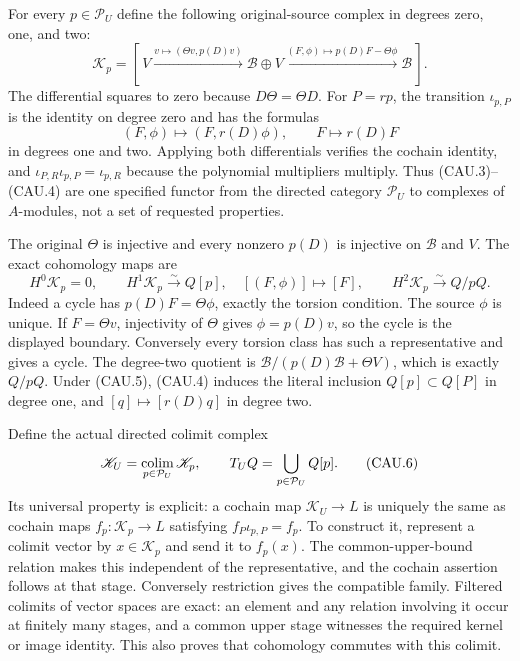 For every $p\in\mathcal P_U$ define the following original-source
complex in degrees zero, one, and two:
\[
 \mathscr K_p=
 [\,V\xrightarrow{v\mapsto(\Theta v,p(D)v)}
       \mathscr B\oplus V
     \xrightarrow{(F,\phi)\mapsto p(D)F-\Theta\phi}\mathscr B\,].
                                                               \tag{CAU.3}
\]
The differential squares to zero because $D\Theta=\Theta D$.
For $P=rp$, the transition $\iota_{p,P}$ is the identity on degree
zero and has the formulas
\[
 (F,\phi)\longmapsto(F,r(D)\phi),\qquad
 F\longmapsto r(D)F                                           \tag{CAU.4}
\]
in degrees one and two.  Applying both differentials verifies the
cochain identity, and $\iota_{P,R}\iota_{p,P}=\iota_{p,R}$ because
the polynomial multipliers multiply.  Thus (CAU.3)--(CAU.4) are one
specified functor from the directed category $\mathcal P_U$ to complexes
of $A$-modules, not a set of requested properties.

The original $\Theta$ is injective and every nonzero $p(D)$ is injective
on $\mathscr B$ and $V$.  The exact cohomology maps are
\[
 H^0\mathscr K_p=0,\qquad
 H^1\mathscr K_p\xrightarrow{\sim}Q[p],\quad[(F,\phi)]\mapsto[F],
 \qquad H^2\mathscr K_p\xrightarrow{\sim}Q/pQ.                 \tag{CAU.5}
\]
Indeed a cycle has $p(D)F=\Theta\phi$, exactly the torsion condition.
The source $\phi$ is unique.  If $F=\Theta v$, injectivity of $\Theta$
gives $\phi=p(D)v$, so the cycle is the displayed boundary.  Conversely
every torsion class has such a representative and gives a cycle.
The degree-two quotient is
$\mathscr B/(p(D)\mathscr B+\Theta V)$, which is exactly $Q/pQ$.
Under (CAU.5), (CAU.4) induces the literal inclusion $Q[p]\subset Q[P]$
in degree one, and $[q]\mapsto[r(D)q]$ in degree two.

Define the actual directed colimit complex
\[
 \mathscr K_U=\mathop{\rm colim}_{p\in\mathcal P_U}\mathscr K_p,
 \qquad T_UQ=\bigcup_{p\in\mathcal P_U}Q[p].                  \tag{CAU.6}
\]
Its universal property is explicit: a cochain map $\mathscr K_U\to L$
is uniquely the same as cochain maps $f_p:\mathscr K_p\to L$ satisfying
$f_P\iota_{p,P}=f_p$.  To construct it, represent a colimit vector by
$x\in\mathscr K_p$ and send it to $f_p(x)$.  The common-upper-bound
relation makes this independent of the representative, and the
cochain assertion follows at that stage.  Conversely restriction gives
the compatible family.  Filtered colimits of vector spaces are exact:
an element and any relation involving it occur at finitely many stages,
and a common upper stage witnesses the required kernel or image identity.
This also proves that cohomology commutes with this colimit.

